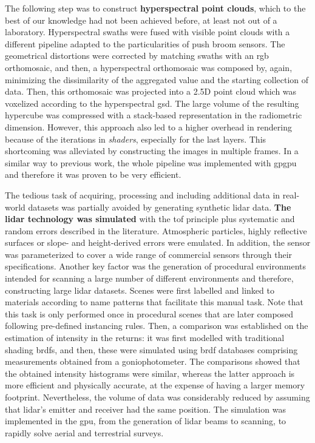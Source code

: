The following step was to construct \textbf{hyperspectral point clouds}, which to the best of our knowledge had not been achieved before, at least not out of a laboratory. Hyperspectral swaths were fused with visible point clouds with a different pipeline adapted to the particularities of push broom sensors. The geometrical distortions were corrected by matching swaths with an \acrshort{rgb} orthomosaic, and then, a hyperspectral orthomosaic was composed by, again, minimizing the dissimilarity of the aggregated value and the starting collection of data. Then, this orthomosaic was projected into a 2.5D point cloud which was voxelized according to the hyperspectral \acrshort{gsd}. The large volume of the resulting hypercube was compressed with a stack-based representation in the radiometric dimension. However, this approach also led to a higher overhead in rendering because of the iterations in \textit{shaders}, especially for the last layers. This shortcoming was alleviated by constructing the images in multiple frames. In a similar way to previous work, the whole pipeline was implemented with \acrshort{gpgpu} and therefore it was proven to be very efficient.

The tedious task of acquiring, processing and including additional data in real-world datasets was partially avoided by generating synthetic \acrshort{lidar} data. \textbf{The \acrshort{lidar} technology was simulated} with the \acrshort{tof} principle plus systematic and random errors described in the literature. Atmospheric particles, highly reflective surfaces or slope- and height-derived errors were emulated. In addition, the sensor was parameterized to cover a wide range of commercial sensors through their specifications. Another key factor was the generation of procedural environments intended for scanning a large number of different environments and therefore, constructing large \acrshort{lidar} datasets. Scenes were first labelled and linked to materials according to name patterns that facilitate this manual task. Note that this task is only performed once in procedural scenes that are later composed following pre-defined instancing rules. Then, a comparison was established on the estimation of intensity in the returns: it was first modelled with traditional shading \acrshort{brdf}s, and then, these were simulated using \acrshort{brdf} databases comprising measurements obtained from a goniophotometer. The comparisons showed that the obtained intensity histograms were similar, whereas the latter approach is more efficient and physically accurate, at the expense of having a larger memory footprint. Nevertheless, the volume of data was considerably reduced by assuming that \acrshort{lidar}'s emitter and receiver had the same position. The simulation was implemented in the \acrshort{gpu}, from the generation of \acrshort{lidar} beams to scanning, to rapidly solve aerial and terrestrial surveys. 

